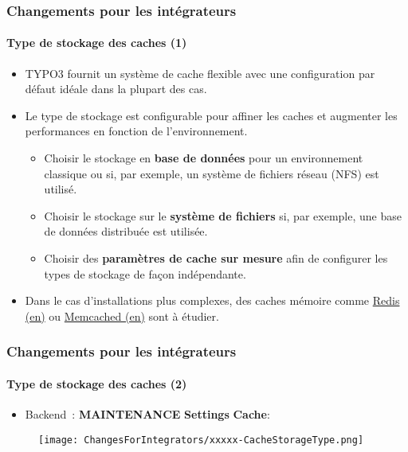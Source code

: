 \begin{frame}[fragile]
	\frametitle{Changements pour les intégrateurs}
	\framesubtitle{Type de stockage des caches (1)}

	\begin{itemize}

		\item TYPO3 fournit un système de cache flexible avec une configuration
			par défaut idéale dans la plupart des cas.
		\item Le type de stockage est configurable pour affiner les caches et
			augmenter les performances en fonction de l'environnement.

			\begin{itemize}
				\item Choisir le stockage en \textbf{base de données} pour un environnement classique
					ou si, par exemple, un système de fichiers réseau (NFS) est utilisé.
				\item Choisir le stockage sur le \textbf{système de fichiers} si, par exemple,
					une base de données distribuée est utilisée.
				\item Choisir des \textbf{paramètres de cache sur mesure} afin de configurer les types de stockage
					de façon indépendante.
			\end{itemize}

		\item Dans le cas d'installations plus complexes, des caches mémoire comme
			\href{https://redis.io/}{Redis (en)}
			ou
			\href{https://memcached.org/}{Memcached (en)} sont à étudier.

	\end{itemize}

\end{frame}


\begin{frame}[fragile]
	\frametitle{Changements pour les intégrateurs}
	\framesubtitle{Type de stockage des caches (2)}

	\begin{itemize}

		\item Backend~: \textbf{MAINTENANCE} \hspace{0.1cm}\textbf{Settings} \hspace{0.1cm}\textbf{Cache}:
		\end{itemize}

	\begin{figure}
		\texttt{[image: ChangesForIntegrators/xxxxx-CacheStorageType.png]}
	\end{figure}

\end{frame}

